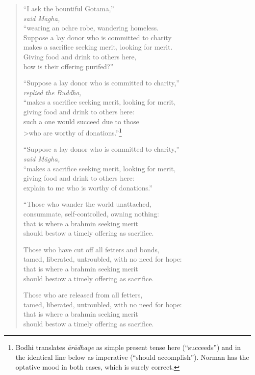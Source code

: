 \documentclass[12pt,openany]{book}%
\newcommand*{\scspeaker}[1]{\hspace{2em}\textit{#1}}
\begin{document}
\begin{verse}%
“I ask the bountiful Gotama,” \\
\scspeaker{said \textsanskrit{Māgha}, }\\
“wearing an ochre robe, wandering homeless. \\
Suppose a lay donor who is committed to charity \\
makes a sacrifice seeking merit, looking for merit. \\
Giving food and drink to others here, \\
how is their offering purifed?” 

“Suppose a lay donor who is committed to charity,” \\
\scspeaker{replied the Buddha, }\\
“makes a sacrifice seeking merit, looking for merit, \\
giving food and drink to others here: \\
such a one would succeed due to those \\>who are worthy of donations.”\footnote{Bodhi translates \textit{\textsanskrit{ārādhaye}} as simple present tense here (“succeeds”) and in the identical line below as imperative (“should accomplish”). Norman has the optative mood in both cases, which is surely correct. } 

“Suppose a lay donor who is committed to charity,” \\
\scspeaker{said \textsanskrit{Māgha}, }\\
“makes a sacrifice seeking merit, looking for merit, \\
giving food and drink to others here: \\
explain to me who is worthy of donations.” 

“Those who wander the world unattached, \\
consummate, self-controlled, owning nothing: \\
that is where a brahmin seeking merit \\
should bestow a timely offering as sacrifice. 

Those who have cut off all fetters and bonds, \\
tamed, liberated, untroubled, with no need for hope: \\
that is where a brahmin seeking merit \\
should bestow a timely offering as sacrifice. 

Those who are released from all fetters, \\
tamed, liberated, untroubled, with no need for hope: \\
that is where a brahmin seeking merit \\
should bestow a timely offering as sacrifice. 


\end{verse}
\end{document}
